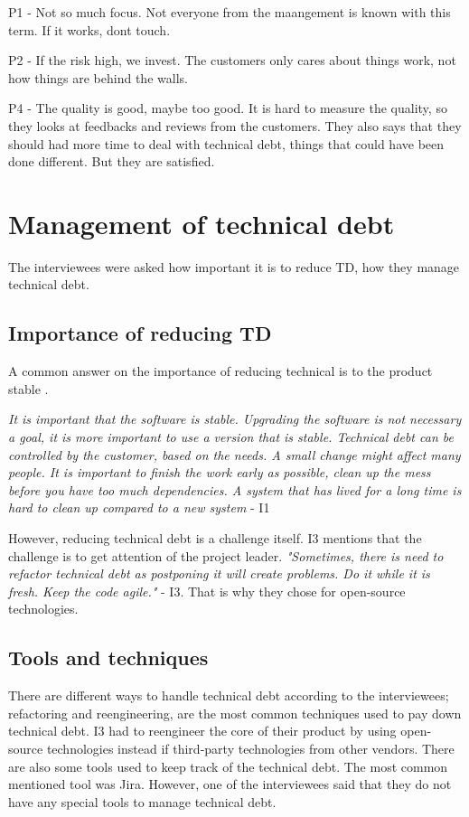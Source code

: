 P1 - Not so much focus. Not everyone from the maangement is known with this term. If it works, dont touch. 

P2 - If the risk high, we invest. The customers only cares about things work, not how things are behind the walls. 

P4 - The quality is good, maybe too good. It is hard to measure the quality, so they looks at feedbacks and reviews from the customers. They also says that they should had more time to deal with technical debt, things that could have been done different. But they are satisfied.


\section{Management of technical debt}
\label{sec:managing}
The interviewees were asked how important it is to reduce TD, how they manage technical debt. 

\subsection{Importance of reducing TD}
A common answer on the importance of reducing technical is to the product stable .

\begin{displayquote}
\textit{It is important that the software is stable. Upgrading the software is not necessary a goal, it is more important to use a version that is stable. Technical debt can be controlled by the customer, based on the needs. A small change might affect many people. It is important to finish the work early as possible, clean up the mess before you have too much dependencies. A system that has lived for a long time is hard to clean up compared to a new system} - I1
\end{displayquote}

However, reducing technical debt is a challenge itself. I3 mentions that the challenge is to get attention of the project leader. \textit{"Sometimes, there is need to refactor technical debt as postponing it will create problems. Do it while it is fresh. Keep the code agile."} - I3. That is why they chose for open-source technologies.


\subsection{Tools and techniques}
There are different ways to handle technical debt according to the interviewees; refactoring and reengineering, are the most common techniques used to pay down technical debt. I3 had to reengineer the core of their product by using open-source technologies instead if third-party technologies from other vendors. There are also some tools used to keep track of the technical debt. The most common mentioned tool was Jira. However, one of the interviewees said that they do not have any special tools to manage technical debt. 

